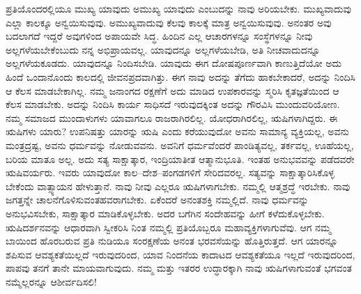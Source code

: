 ಪ್ರತಿಯೊಂದರಲ್ಲಿಯೂ ಮುಖ್ಯ ಯಾವುದು ಅಮುಖ್ಯ ಯಾವುದು ಎಂಬುದನ್ನು ನಾವು ಅರಿಯಬೇಕು. ಮುಖ್ಯವಾದುವು ಎಲ್ಲಾ ಕಾಲಕ್ಕೂ ಅನ್ವಯಿಸುವುವು. ಅಮುಖ್ಯವಾದುವು ಕೆಲವು ಕಾಲಕ್ಕೆ ಮಾತ್ರ ಅನ್ವಯಿಸುವುವು. ಅನಂತರ ಅವು ಬದಲಾಗದೆ ಇದ್ದರೆ ಅವುಗಳಿಂದ ಅಪಾಯವೇ ಸಿದ್ಧ. ಹಿಂದಿನ ಎಲ್ಲ ಆಚಾರಗಳನ್ನೂ ಸಂಸ್ಥೆಗಳನ್ನೂ ನೀವು ಅಲ್ಲಗಳೆಯಬೇಕೆಂಬುದು ನನ್ನ ಅಭಿಪ್ರಾಯವಲ್ಲ. ಯಾವುದನ್ನೂ ಅಲ್ಲಗಳೆಯಬೇಡಿ, ಅತಿ ನೀಚವಾದುದನ್ನೂ ಅಲ್ಲಗಳೆಯಕೂಡದು. ಯಾವುದನ್ನೂ ನಿಂದಿಸಬೇಡಿ. ಯಾವುದು ಈಗ ದೋಷಪೂರ್ಣವಾಗಿ ಕಾಣುತ್ತಿದೆಯೋ ಅದು ಹಿಂದೆ ಒಂದಾನೊಂದು ಕಾಲದಲ್ಲಿ ಜೀವನಪ್ರದ\-ವಾಗಿತ್ತು. ಈಗ ನಾವು ಅದನ್ನು ತೆಗೆದು ಹಾಕಬೇಕಾದರೆ, ಅದನ್ನು ನಿಂದಿಸಿ ಆ ಕೆಲಸ ಮಾಡಬೇಕಾಗಿಲ್ಲ. ನಮ್ಮ ಜನಾಂಗದ ರಕ್ಷಣೆಗೆ ಅದು ಮಾಡಿದ ಉಪಕಾರವನ್ನು ಸ್ಮರಿಸಿ ಕೃತಜ್ಞತೆ\-ಯಿಂದ ಆ ಕೆಲಸ ಮಾಡಬೇಕು. ಅದನ್ನು ನಿಂದಿಸಿ ಕಾರ್ಯ ಸಾಧಿಸದೆ ಇರುವುದಕ್ಕಿಂತ ಅದನ್ನು ಗೌರವಿಸಿ ಮುಂದುವರಿಯೋಣ. ನಮ್ಮ ಸಮಾಜದ ಮುಂದಾಳುಗಳು ಯಾವಾಗಲೂ ರಾಜರಾಗಿರಲಿಲ್ಲ. ಯೋಧರಾಗಿರಲಿಲ್ಲ, ಋಷಿಗಳಾಗಿದ್ದರು. ಈ ಋಷಿಗಳು ಯಾರು? ಉಪನಿಷತ್ತು ಯಾರನ್ನು ಋಷಿ ಎಂದು ಕರೆಯುವುದೋ ಅವನು ಸಾಮಾನ್ಯ ವ್ಯಕ್ತಿಯಲ್ಲ, ಅವನು ಮಂತ್ರದ್ರಷ್ಟ, ಅವನು ಧರ್ಮವನ್ನು ನೋಡುವವನು. ಅವನಿಗೆ ಧರ್ಮವೆಂದರೆ ಪಾಂಡಿತ್ಯವಲ್ಲ, ತರ್ಕವಲ್ಲ, ಊಹೆಯಲ್ಲ, ಬರಿಯ ಮಾತೂ ಅಲ್ಲ. ಅದು ಸತ್ಯ ಸಾಕ್ಷಾತ್ಕಾರ, ಇಂದ್ರಿಯಾತೀತ ಆತ್ಮಾನು\-ಭೂತಿ. ಇಂತಹ ಅನುಭವವನ್ನು ಪಡೆದವರೇ ಋಷಿವರ್ಯರು. ಇವರು ಯಾವುದೋ ಕಾಲ–ದೇಶ–ಪಂಗಡಗಳಿಗೆ ಸೇರಿದವರಲ್ಲ. ಸತ್ಯವನ್ನು ಸಾಕ್ಷಾತ್ಕಾರಿಸಿಕೊಳ್ಳ ಬೇಕೆಂದು ವಾತ್ಸ್ಯಾಯನ ಹೇಳುತ್ತಾನೆ. ನಾವು ನೀವು ಎಲ್ಲರೂ ಋಷಿಗಳಾಗಬೇಕು. ನಮ್ಮಲ್ಲಿ ಆತ್ಮಶ್ರದ್ಧೆ ಇರಬೇಕು. ನಾವು ಜಗತ್ತನ್ನೇ ಚಾಲನೆಗೊಳಿಸುವಂತಹ\-ವರಾಗಬೇಕು. ಏಕೆಂದರೆ ಅನಂತಶಕ್ತಿ ನಮ್ಮಲ್ಲಿದೆ. ನಾವು ಧರ್ಮವನ್ನು ಅನುಭವಿಸಬೇಕು, ಸಾಕ್ಷಾತ್ಕಾರ ಮಾಡಿಕೊಳ್ಳಬೇಕು. ಅದರ ಬಗೆಗಿನ ಸಂದೇಹವನ್ನು ಹೀಗೆ ಕಳೆದು\-ಕೊಳ್ಳಬೇಕು. ಋಷಿದರ್ಶನವನ್ನು ಆಧಾರವಾಗಿ ಸ್ವೀಕರಿಸಿ ನಿಂತ ನಮ್ಮಲ್ಲಿ ಪ್ರತಿಯೊಬ್ಬರೂ ಮಹಾವ್ಯಕ್ತಿಗಳಾಗುವೆವು. ಆಗ ನಮ್ಮ ಬಾಯಿಂದ ಹೊರಬರುವ ಪ್ರತಿ ನುಡಿಯೂ ಸಂರಕ್ಷಣೆಯ ಅನಂತ ಭರವಸೆಯನ್ನು ಹೊತ್ತಿರುತ್ತದೆ. ಆಗ ಯಾರನ್ನೂ ಶಪಿಸುವ ಆವಶ್ಯಕತೆಯಿಲ್ಲದೆ ಇರುವುದರಿಂದ, ಯಾವ ನಿಂದನೆಯ ಕಾದಾಟದ ಆವಶ್ಯಕತೆಯೂ ಇಲ್ಲದೆ ಇರುವುದರಿಂದ, ಪಾಪವು ತನಗೆ ತಾನೇ ಮಾಯವಾಗುವುದು. ನಮ್ಮ ಮತ್ತು ಇತರರ ಉದ್ಧಾರಕ್ಕಾಗಿ ನಾವು ಋಷಿಗಳಾಗುವಂತೆ ಭಗವಂತ ನಮ್ಮೆಲ್ಲರನ್ನೂ ಆಶೀರ್ವದಿಸಲಿ!

